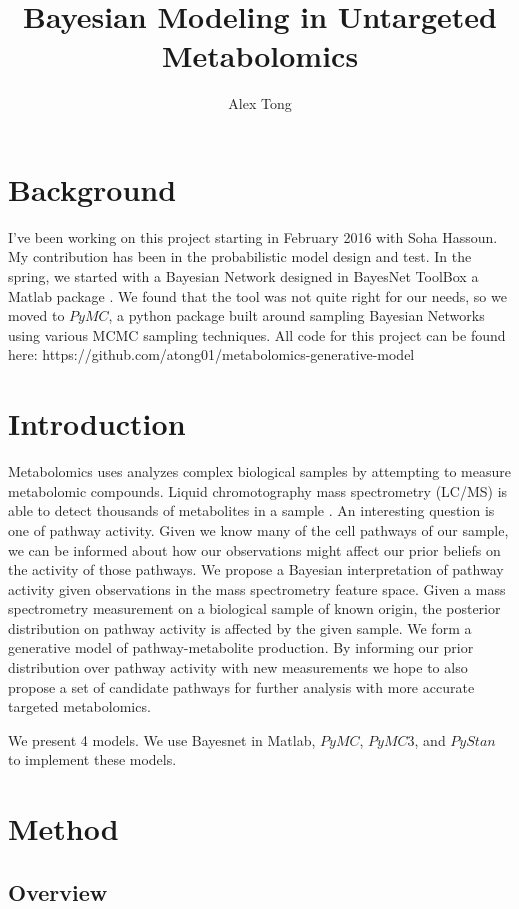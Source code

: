 \documentclass[11pt]{article}
\title{Bayesian Modeling in Untargeted Metabolomics}
\author{Alex Tong}
\begin{document}
\maketitle

\section{Background}

I've been working on this project starting in February 2016 with Soha Hassoun. My contribution has been in the probabilistic model design and test. In the spring, we started with a Bayesian Network designed in BayesNet ToolBox a Matlab package \cite{bayesnet}. We found that the tool was not quite right for our needs, so we moved to $PyMC$, a python package built around sampling Bayesian Networks using various MCMC sampling techniques. All code for this project can be found here: https://github.com/atong01/metabolomics-generative-model

\section{Introduction}

Metabolomics uses analyzes complex biological samples by attempting to measure metabolomic compounds. Liquid chromotography mass spectrometry (LC/MS) is able to detect thousands of metabolites in a sample \cite{LCMS}. An interesting question is one of pathway activity. Given we know many of the cell pathways of our sample, we can be informed about how our observations might affect our prior beliefs on the activity of those pathways. We propose a Bayesian interpretation of pathway activity given observations in the mass spectrometry feature space. Given a mass spectrometry measurement on a biological sample of known origin, the posterior distribution on pathway activity is affected by the given sample. We form a generative model of pathway-metabolite production. By informing our prior distribution over pathway activity with new measurements we hope to also propose a set of candidate pathways for further analysis with more accurate targeted metabolomics.

We present 4 models. We use Bayesnet in Matlab, $PyMC$, $PyMC3$, and $PyStan$ to implement these models.

\section{Method}
\subsection{Overview}
\end{document}
